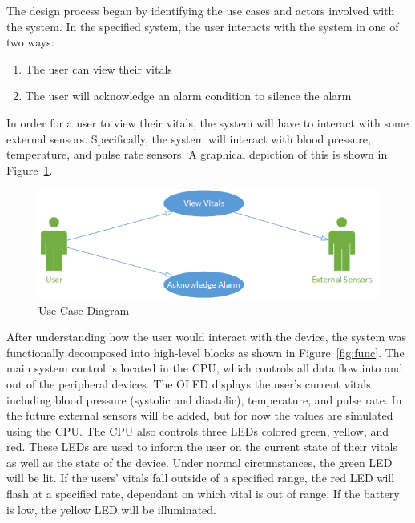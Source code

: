 \documentclass[12pt]{article} %
\begin{document}

The design process began by identifying the use cases and actors involved with the system.  In the specified system, the user interacts with the system in one of two ways:
\begin{enumerate}
  \item The user can view their vitals
  \item The user will acknowledge an alarm condition to silence the alarm
\end{enumerate}
In order for a user to view their vitals, the system will have to interact with some external sensors.  Specifically, the system will interact with blood pressure, temperature, and pulse rate sensors.  A graphical depiction of this is shown in Figure~\ref{fig:use}.

\begin{figure}
    \centering
    \includegraphics[width=\textwidth]{../design/use_cases_graphical}
    \caption{Use-Case Diagram}
    \label{fig:use}
\end{figure}

After understanding how the user would interact with the device, the system was
functionally decomposed into high-level blocks as shown in
Figure~\ref{fig:func}.  The main system control is located in the CPU, which
controls all data flow into and out of the peripheral devices.  The OLED
displays the user's current vitals including blood pressure (systolic and
diastolic), temperature, and pulse rate.  In the future external sensors will
be added, but for now the values are simulated using the CPU.  The CPU also
controls three LEDs colored green, yellow, and red.  These LEDs are used to
inform the user on the current state of their vitals as well as the state of
the device.  Under normal circumstances, the green LED will be lit.  If the
users' vitals fall outside of a specified range, the red LED will flash at a
specified rate, dependant on which vital is out of range.  If the battery is
low, the yellow LED will be illuminated.
\end{document}
